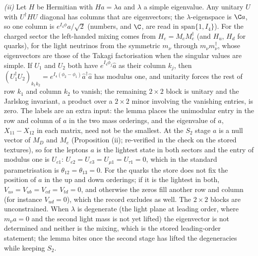 \emph{(ii)} Let $H$ be Hermitian with $Ha = \lambda a$ and $\lambda$ a simple eigenvalue. Any unitary $U$ with $U^{\dagger}HU$ diagonal has columns that are eigenvectors; the $\lambda$-eigenspace is $\C a$, so one column is $e^{I_{4}\phi}a/\sqrt2$ (numbers, and $\C$, are read in $\mathrm{span}\{1, I_{4}\}$). For the charged sector the left-handed mixing comes from $H_{e} = M_{e}M_{e}^{\dagger}$ (and $H_{u}$, $H_{d}$ for quarks), for the light neutrinos from the symmetric $m_{\nu}$ through $m_{\nu}m_{\nu}^{\dagger}$, whose eigenvectors are those of the Takagi factorisation when the singular values are simple. If $U_{1}$ and $U_{2}$ both have $e^{I_{4}\phi_{j}}\hat a$ as their column $k_{j}$, then $(U_{1}^{\dagger}U_{2})_{k_{1}k_{2}} = e^{I_{4}(\phi_{2} - \phi_{1})}\hat a^{\dagger}\hat a$ has modulus one, and unitarity forces the rest of row $k_{1}$ and column $k_{2}$ to vanish; the remaining $2 \times 2$ block is unitary and the Jarlskog invariant, a product over a $2 \times 2$ minor involving the vanishing entries, is zero. The labels are an extra input: the lemma places the unimodular entry in the row and column of $a$ in the two mass orderings, and the eigenvalue of $a$, $X_{11} - X_{12}$ in each matrix, need not be the smallest. At the $S_{2}$ stage $a$ is a null vector of $M_{D}$ and $M_{e}$ (Proposition (ii); re-verified in the check on the stored textures), so for the leptons $a$ is the lightest state in both sectors and the entry of modulus one is $U_{e1}$: $U_{e2} = U_{e3} = U_{\mu1} = U_{\tau1} = 0$, which in the standard parametrisation is $\theta_{12} = \theta_{13} = 0$. For the quarks the store does not fix the position of $a$ in the up and down orderings; if it is the lightest in both, $V_{us} = V_{ub} = V_{cd} = V_{td} = 0$, and otherwise the zeros fill another row and column (for instance $V_{ud} = 0$), which the record excludes as well. The $2 \times 2$ blocks are unconstrained. When $\lambda$ is degenerate (the light plane at leading order, where $m_{\nu}a = 0$ and the second light mass is not yet lifted) the eigenvector is not determined and neither is the mixing, which is the stored leading-order statement; the lemma bites once the second stage has lifted the degeneracies while keeping $S_{2}$.

